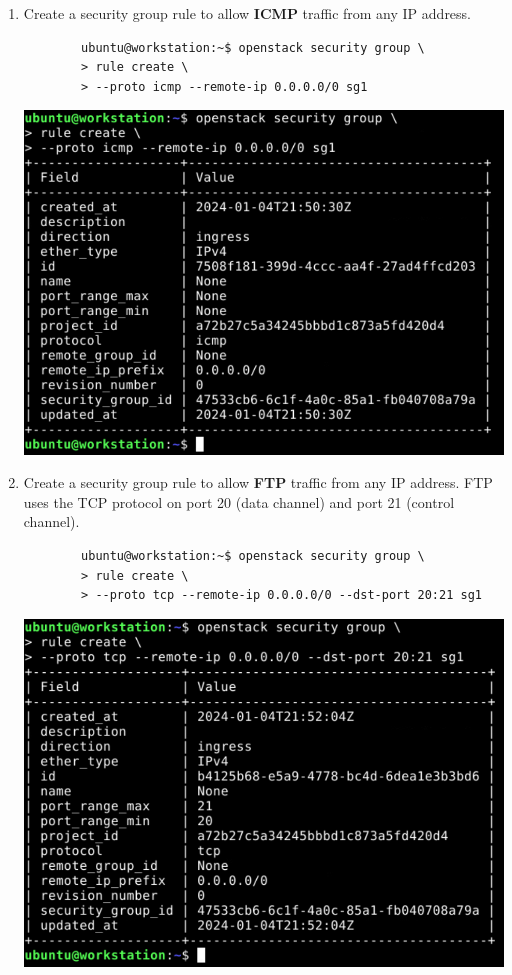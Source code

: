 \documentclass[letterpaper, 12pt]{article}
\begin{document}
\begin{enumerate}
    \item Create a security group rule to allow \textbf{ICMP} traffic from any IP address.
    \begin{lstlisting}
        ubuntu@workstation:~$ openstack security group \
        > rule create \
        > --proto icmp --remote-ip 0.0.0.0/0 sg1
    \end{lstlisting}

    \begin{center}
        \includegraphics[width=\linewidth]{images/part1/step32.png}
    \end{center}

    \item Create a security group rule to allow \textbf{FTP} traffic from any IP address. FTP uses the TCP protocol on
    port 20 (data channel) and port 21 (control channel).
    \begin{lstlisting}
        ubuntu@workstation:~$ openstack security group \
        > rule create \
        > --proto tcp --remote-ip 0.0.0.0/0 --dst-port 20:21 sg1
    \end{lstlisting}

    \begin{center}
        \includegraphics[width=\linewidth]{images/part1/step33.png}
    \end{center}


\end{enumerate}
\end{document}
